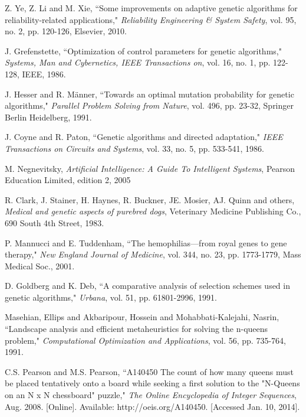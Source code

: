 \documentclass[conference]{IEEEtran}
\begin{document}
\begin{thebibliography}{21}
 Z. Ye, Z. Li and M. Xie, ``Some improvements on adaptive genetic algorithms for reliability-related applications,"
        {\it Reliability Engineering \& System Safety}, vol. 95, no. 2, pp. 120-126, Elsevier, 2010.

 J. Grefenstette, ``Optimization of control parameters for genetic algorithms,"
        {\it Systems, Man and Cybernetics, IEEE Transactions on}, vol. 16, no. 1, pp. 122-128, IEEE, 1986.

 J. Hesser and R. M{\"a}nner, ``Towards an optimal mutation probability for genetic algorithms,"
        {\it Parallel Problem Solving from Nature}, vol. 496, pp. 23-32, Springer Berlin Heidelberg, 1991.

 J. Coyne and R. Paton, ``Genetic algorithms and directed adaptation,"
        {\it IEEE Transactions on Circuits and Systems}, vol. 33, no. 5, pp. 533-541, 1986.

 M. Negnevitsky,
        {\it Artificial Intelligence: A Guide To Intelligent Systems}, Pearson Education Limited, edition 2, 2005


 R. Clark, J. Stainer, H. Haynes, R. Buckner, JE. Mosier, AJ. Quinn and others,
        {\it Medical and genetic aspects of purebred dogs}, Veterinary Medicine Publishing Co., 690 South 4th Street, 1983.


 P. Mannucci and E. Tuddenham, ``The hemophilias—from royal genes to gene therapy,"
        {\it New England Journal of Medicine}, vol. 344, no. 23, pp. 1773-1779, Mass Medical Soc., 2001.

 D. Goldberg and K. Deb, ``A comparative analysis of selection schemes used in genetic algorithms,"
        {\it Urbana}, vol. 51, pp. 61801-2996, 1991.

 Masehian, Ellips and Akbaripour, Hossein and Mohabbati-Kalejahi, Nasrin, ``Landscape analysis and efficient metaheuristics for solving the n-queens problem,"
        {\it Computational Optimization and Applications}, vol. 56, pp. 735-764, 1991.


 C.S. Pearson and M.S. Pearson, ``A140450 The count of how many queens must be placed tentatively onto a board while seeking a first solution to the "N-Queens on an N x N chessboard" puzzle,"
        {\it The Online Encyclopedia of Integer Sequences}, Aug. 2008. [Online]. Available: http://oeis.org/A140450. [Accessed Jan. 10, 2014].

\end{thebibliography}

\end{document}
